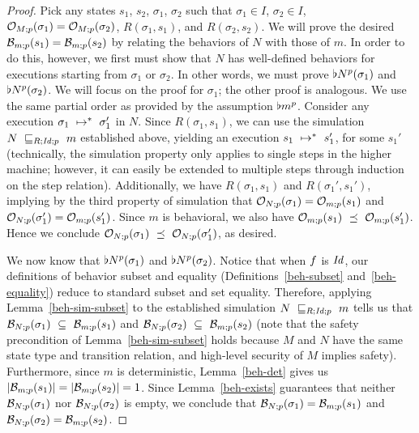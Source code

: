 \begin{proof}
\noindent{}Pick any states $s_1$, $s_2$, $\sigma_1$, $\sigma_2$ such 
that $\sigma_1 \in I$, $\sigma_2 \in I$, 
$\observem{M}{p}{\sigma_1} = \observem{M}{p}{\sigma_2}$,
$R(\sigma_1,s_1)$, and $R(\sigma_2,s_2)$. We will prove the
desired $\behavior{m;p}{s_1} = \behavior{m;p}{s_2}$
by relating the behaviors of $N$ with those of $m$. 
In order to do this, however, we first must show that $N$ has 
well-defined behaviors for executions starting from $\sigma_1$
or $\sigma_2$. In other words, we must prove 
$\behaviorals{N}{p}{\sigma_1}$ and $\behaviorals{N}{p}{\sigma_2}$.
We will focus on the proof for $\sigma_1$; the other proof is
analogous. We use the same partial order as provided
by the assumption $\behavioral{m}{p}$.
Consider any execution $\sigma_1~\steprel^*~\sigma_1'$ in $N$.
Since $R(\sigma_1,s_1)$, we can use the simulation 
$\simu{N}{m}{R;\mathid;p}$ established above, yielding an execution
$s_1~\steprel^*~s_1'$, for some $s_1'$ (technically, the simulation 
property only applies to single steps in the higher machine; 
however, it can easily be extended to multiple steps
through induction on the step relation). Additionally, we have 
$R(\sigma_1,s_1)$ and $R(\sigma_1',s_1')$, implying by the third property 
of simulation that $\observem{N}{p}{\sigma_1} = \observem{m}{p}{s_1}$ and 
$\observem{N}{p}{\sigma_1'} = \observem{m}{p}{s_1'}$.
Since $m$ is behavioral, we also have 
$\observem{m}{p}{s_1}~\preceq~\observem{m}{p}{s_1'}$. Hence we conclude
$\observem{N}{p}{\sigma_1}~\preceq~\observem{N}{p}{\sigma_1'}$, as desired.

We now know that $\behaviorals{N}{p}{\sigma_1}$ and 
$\behaviorals{N}{p}{\sigma_2}$. Notice that
when $\obsrel{R}$ is $\mathid$, our definitions of behavior subset and
equality (Definitions~\ref{beh-subset} and~\ref{beh-equality}) reduce
to standard subset and set equality. Therefore, applying 
Lemma~\ref{beh-sim-subset} to the established simulation
$\simu{N}{m}{R;\mathid;p}$ tells us that 
$\behavior{N;p}{\sigma_1}~\subseteq~\behavior{m;p}{s_1}$
and $\behavior{N;p}{\sigma_2}~\subseteq~\behavior{m;p}{s_2}$ (note that
the safety precondition of Lemma~\ref{beh-sim-subset} holds because $M$ and $N$
have the same state type and transition relation, and high-level security 
of $M$ implies safety). Furthermore,
since $m$ is deterministic, Lemma~\ref{beh-det} gives us 
$| \behavior{m;p}{s_1} | = | \behavior{m;p}{s_2} | = 1$. Since 
Lemma~\ref{beh-exists} guarantees that neither $\behavior{N;p}{\sigma_1}$ nor
$\behavior{N;p}{\sigma_2}$ is empty, we conclude that
$\behavior{N;p}{\sigma_1} = \behavior{m;p}{s_1}$
and $\behavior{N;p}{\sigma_2} = \behavior{m;p}{s_2}$.


\end{proof}
